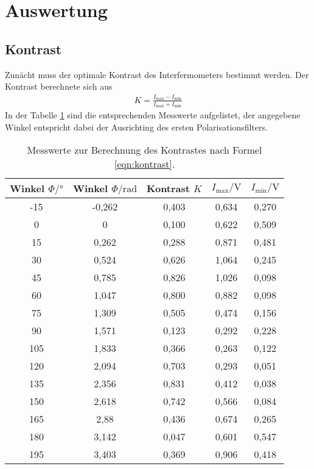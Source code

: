 \section{Auswertung}
\label{sec:Auswertung}
\subsection{Kontrast}
\label{sec:Kontrast}
Zunächt muss der optimale Kontrast des Interfermometers bestimmt
werden.
Der Kontrast berechnete sich aus
\begin{align}
K=\frac{I_\mathrm{max}-I_\mathrm{min}}{I_\mathrm{max}+I_\mathrm{min}}\label{eqn:kontrast}
\end{align}
In der Tabelle \ref{tab:kontrast}
sind die entsprechenden Messwerte aufgelistet, der angegebene Winkel
entspricht dabei der Ausrichting des ersten Polarisationsfilters.
\begin{table}
\centering
\caption{Messwerte zur Berechnung des Kontrastes nach Formel \eqref{eqn:kontrast}.}
\label{tab:kontrast}
\begin{tabular}{c c c c c}
\toprule
   Winkel $\Phi/\si{\degree}$&   Winkel $\Phi/\si{\radian}$ &  Kontrast $K$ &   $I_\mathrm{max}/\si{\volt}$ &    $I_\mathrm{min}/\si{\volt}$ \\
\midrule
    -15 &   -0,262 &      0,403 &   0,634 &    0,270 \\
      0 &    0     &      0,100 &   0,622 &    0,509 \\
     15 &    0,262 &      0,288 &   0,871 &    0,481 \\
     30 &    0,524 &      0,626 &   1,064 &    0,245 \\
     45 &    0,785 &      0,826 &   1,026 &    0,098 \\
     60 &    1,047 &      0,800 &   0,882 &    0,098 \\
     75 &    1,309 &      0,505 &   0,474 &    0,156 \\
     90 &    1,571 &      0,123 &   0,292 &    0,228 \\
    105 &    1,833 &      0,366 &   0,263 &    0,122 \\
    120 &    2,094 &      0,703 &   0,293 &    0,051 \\
    135 &    2,356 &      0,831 &   0,412 &    0,038 \\
    150 &    2,618 &      0,742 &   0,566 &    0,084 \\
    165 &    2,88  &      0,436 &   0,674 &    0,265 \\
    180 &    3,142 &      0,047 &   0,601 &    0,547 \\
    195 &    3,403 &      0,369 &   0,906 &    0,418 \\
\bottomrule
\end{tabular}
\end{table}

